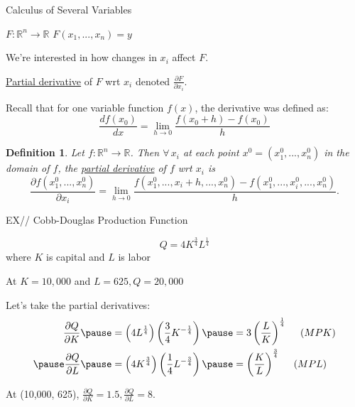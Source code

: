 \documentclass[xcolor=dvipsnames, compress, t]{beamer}
\newtheorem{defin}{Definition}
\newcommand{\vs}{\vspace{\baselineskip}}
\begin{document}
\begin{frame}{Calculus of Several Variables}

$F: \mathds{R}^n \rightarrow \mathds{R}$ 	\tabto{4cm} $F(x_1, ..., x_n) = y$

We're interested in how changes in $x_i$ affect $F$.

\vs \underline{Partial derivative} of $F$ wrt $x_i$ denoted $\frac{\partial F}{\partial x_i}$.

\vs Recall that for one variable function $f(x)$, the derivative was defined as: $$\frac{d f(x_0)}{d x} = \lim_{h \rightarrow 0} \frac{f(x_0 + h) - f(x_0)}{h}$$ \pause

\begin{defin}
Let $f: \mathds{R}^n \rightarrow \mathds{R}$. Then $\forall \, x_i$ at each point $x^0 = (x_1^0, ..., x_n^0)$ in the domain of $f$, the \underline{partial derivative} of $f$ wrt $x_i$ is $$\frac{\partial f(x_1^0, ..., x_n^0)}{\partial x_i} = \lim_{h\rightarrow 0} \frac{f(x_1^0, ..., x_i + h, ..., x_n^0) - f(x_1^0, ..., x_i^0, ..., x_n^0)}{h}.$$
\end{defin}

\end{frame}


\begin{frame}{EX// Cobb-Douglas Production Function}

$$Q = 4 K^{\frac{3}{4}} L^{\frac{1}{4}}$$ where $K$ is capital and $L$ is labor \pause

\vs At $K = 10,000$ and $L = 625, Q=20,000$ \pause

Let's take the partial derivatives:
\begin{equation*}
\begin{aligned}
\frac{\partial Q}{\partial K} \pause &= \left(4 L^{\frac{1}{4}}\right) \left( \frac{3}{4} K^{-\frac{1}{4}}\right) \pause = 3 \left( \frac{L}{K}\right)^{\frac{1}{4}} \, \, \, \, \, \, \, \, (MPK) \\ \pause
\frac{\partial Q}{\partial L} \pause &=  \left(4 K^{\frac{3}{4}}\right) \left( \frac{1}{4} L^{-\frac{3}{4}}\right) \pause =  \left( \frac{K}{L}\right)^{\frac{3}{4}} \, \, \, \, \, \, \, \, (MPL) 
\end{aligned}
\end{equation*}

\pause
At (10,000, 625), $\frac{\partial Q}{\partial K} = 1.5, \frac{\partial Q}{\partial L} = 8$.

\end{frame}
\end{document}
